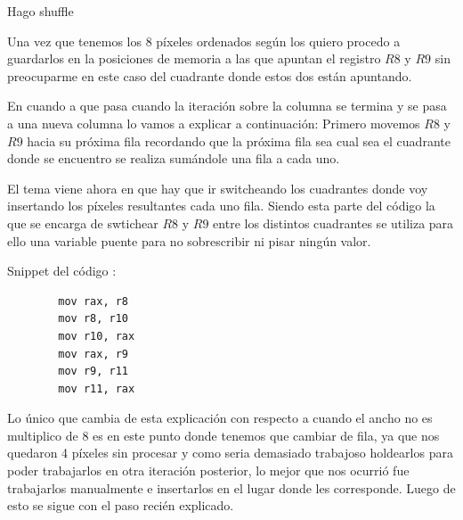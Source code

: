 Hago shuffle 



Una vez que tenemos los 8 píxeles ordenados según los quiero procedo a guardarlos en la posiciones de memoria a las que apuntan el registro $R8$ y $R9$ sin preocuparme en este caso del cuadrante donde estos dos están apuntando.

En cuando a que pasa cuando la iteración sobre la columna se termina y se pasa a una nueva columna lo vamos a explicar a continuación:
Primero movemos $R8$ y $R9$ hacia su próxima fila recordando que la próxima fila sea cual sea el cuadrante donde se encuentro se realiza sumándole una fila a cada uno.

El tema viene ahora en que hay que ir switcheando los cuadrantes donde voy insertando los píxeles resultantes cada uno fila. Siendo esta parte del código la que se encarga de swtichear $R8$ y $R9$ entre los distintos cuadrantes se utiliza para ello una variable puente para no sobrescribir ni pisar ningún valor. 

Snippet del código :

\begin{lstlisting}
		mov rax, r8
		mov r8, r10
		mov r10, rax
		mov rax, r9
		mov r9, r11
		mov r11, rax
\end{lstlisting}

Lo único que cambia de esta explicación con respecto a cuando el ancho no es multiplico de 8 es en este punto donde tenemos que cambiar de fila, ya que nos quedaron 4 píxeles sin procesar y como seria demasiado trabajoso holdearlos para poder trabajarlos en otra iteración posterior, lo mejor que nos ocurrió fue trabajarlos manualmente e insertarlos en el lugar donde les corresponde. Luego de esto se sigue con el paso recién explicado.



